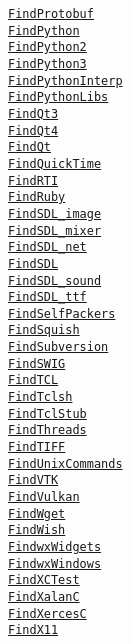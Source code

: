 \documentclass{article}
\newcommand{\cmakemodule}[1]{{\href{https://cmake.org/cmake/help/v3.13/module/#1.html}{{\lstinline{#1}}}}}
\begin{document}
\begin{minipage}[t]{0.18\linewidth}
\cmakemodule{FindProtobuf}\\
\cmakemodule{FindPython}\\
\cmakemodule{FindPython2}\\
\cmakemodule{FindPython3}\\
\cmakemodule{FindPythonInterp}\\
\cmakemodule{FindPythonLibs}\\
\cmakemodule{FindQt3}\\
\cmakemodule{FindQt4}\\
\cmakemodule{FindQt}\\
\cmakemodule{FindQuickTime}\\
\cmakemodule{FindRTI}\\
\cmakemodule{FindRuby}\\
\cmakemodule{FindSDL_image}\\
\cmakemodule{FindSDL_mixer}\\
\cmakemodule{FindSDL_net}\\
\cmakemodule{FindSDL}\\
\cmakemodule{FindSDL_sound}\\
\cmakemodule{FindSDL_ttf}\\
\cmakemodule{FindSelfPackers}\\
\cmakemodule{FindSquish}\\
\cmakemodule{FindSubversion}\\
\cmakemodule{FindSWIG}\\
\cmakemodule{FindTCL}\\
\cmakemodule{FindTclsh}\\
\cmakemodule{FindTclStub}\\
\cmakemodule{FindThreads}\\
\cmakemodule{FindTIFF}\\
\cmakemodule{FindUnixCommands}\\
\cmakemodule{FindVTK}\\
\cmakemodule{FindVulkan}\\
\cmakemodule{FindWget}\\
\cmakemodule{FindWish}\\
\cmakemodule{FindwxWidgets}\\
\cmakemodule{FindwxWindows}\\
\cmakemodule{FindXCTest}\\
\cmakemodule{FindXalanC}\\
\cmakemodule{FindXercesC}\\
\cmakemodule{FindX11}\\

\end{minipage}
\end{document}
